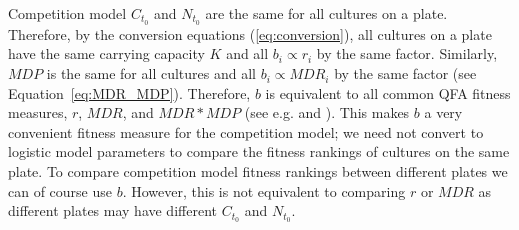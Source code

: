 %

Competition model \(C_{t_{0}}\) and \(N_{t_{0}}\) are the same for all
cultures on a plate. Therefore, by the conversion equations
(\ref{eq:conversion}), all cultures on a plate have the same carrying
capacity \(K\) and all \(b_{i} \propto r_{i}\) by the same
factor. Similarly, \(MDP\) is the same for all cultures and all
\(b_{i} \propto MDR_{i}\) by the same factor (see
Equation~\ref{eq:MDR_MDP}). Therefore, \(b\) is equivalent to all
common QFA fitness measures, \(r\), \(MDR\), and \(MDR*MDP\) (see
e.g. \citet{Addinall2011} and \citet{qfa2016}). This makes \(b\) a
very convenient fitness measure for the competition model; we need not
convert to logistic model parameters to compare the fitness rankings
of cultures on the same plate. To compare competition model fitness
rankings between different plates we can of course use \(b\). However,
this is not equivalent to comparing \(r\) or \(MDR\) as different
plates may have different \(C_{t_{0}}\) and \(N_{t_{0}}\).

